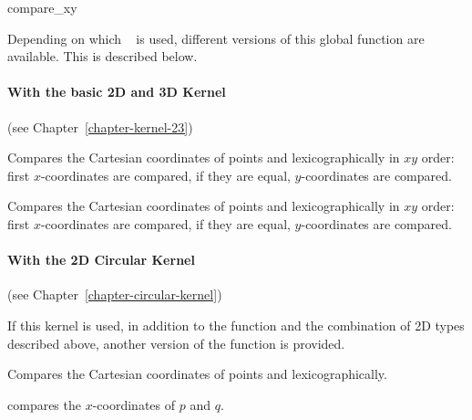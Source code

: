 \begin{ccRefFunction}{compare_xy}

Depending on which \cgal\  is used,
different versions of this global function are available. This is
described below.

\paragraph{With the basic 2D and 3D Kernel} (see Chapter~\ref{chapter-kernel-23})

      {Compares the Cartesian coordinates of points  and
        lexicographically in $xy$ order: first 
       $x$-coordinates are compared, if they are equal, $y$-coordinates
       are compared.}

      {Compares the Cartesian coordinates of points  and
        lexicographically in $xy$ order: first 
       $x$-coordinates are compared, if they are equal, $y$-coordinates
       are compared.}

\paragraph{With the 2D Circular Kernel} (see Chapter~\ref{chapter-circular-kernel}) 


If this kernel is used, in addition to the function and the
combination of 2D types described above, another version of the function
is provided.

{Compares the Cartesian coordinates of points  and
        lexicographically.}

{compares the $x$-coordinates of $p$ and $q$.}

\ccSeeAlso
{} \\
 \\
 \\
 \\
 \\
 \\
 \\

\end{ccRefFunction}

